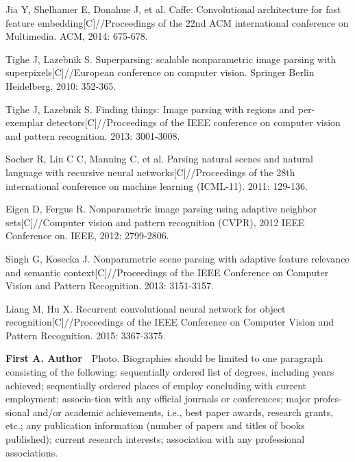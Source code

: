 \documentclass[10.5pt,compsoc]{TsT}
\theoremstyle{mystyle}
\begin{document}
{\begin{thebibliography}{99}
Jia Y, Shelhamer E, Donahue J, et al. Caffe: Convolutional architecture for fast feature embedding[C]//Proceedings of the 22nd ACM international conference on Multimedia. ACM, 2014: 675-678.

Tighe J, Lazebnik S. Superparsing: scalable nonparametric image parsing with superpixels[C]//European conference on computer vision. Springer Berlin Heidelberg, 2010: 352-365.

Tighe J, Lazebnik S. Finding things: Image parsing with regions and per-exemplar detectors[C]//Proceedings of the IEEE conference on computer vision and pattern recognition. 2013: 3001-3008.

Socher R, Lin C C, Manning C, et al. Parsing natural scenes and natural language with recursive neural networks[C]//Proceedings of the 28th international conference on machine learning (ICML-11). 2011: 129-136.

Eigen D, Fergus R. Nonparametric image parsing using adaptive neighbor sets[C]//Computer vision and pattern recognition (CVPR), 2012 IEEE Conference on. IEEE, 2012: 2799-2806.

Singh G, Kosecka J. Nonparametric scene parsing with adaptive feature relevance and semantic context[C]//Proceedings of the IEEE Conference on Computer Vision and Pattern Recognition. 2013: 3151-3157.

Liang M, Hu X. Recurrent convolutional neural network for object recognition[C]//Proceedings of the IEEE Conference on Computer Vision and Pattern Recognition. 2015: 3367-3375.

\begin{strip}
\end{strip}

\begin{biography}
\noindent
\textbf{First A. Author}\ \  Photo. Biographies should be limited to one paragraph consisting of the following: sequentially ordered list of degrees, including years achieved; sequentially ordered places of employ concluding with current employment; associa-tion with any official journals or conferences; major profes-sional and/or academic achievements, i.e., best paper awards, research grants, etc.; any publication information (number of papers and titles of books published); current research interests; association with any professional associations.
\end{biography}


\end{thebibliography}}
\end{document}
